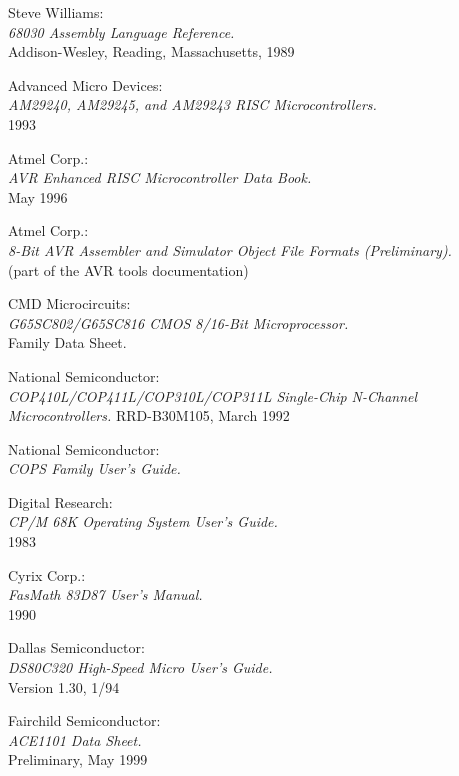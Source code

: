  Steve Williams: \\
                   {\em 68030 Assembly Language Reference.\/} \\
		   Addison-Wesley, Reading, Massachusetts, 1989

 Advanced Micro Devices: \\
		 {\em AM29240, AM29245, and AM29243 RISC
                  Microcontrollers.\/} \\
		 1993

 Atmel Corp.: \\
                {\em AVR Enhanced RISC Microcontroller Data Book.\/} \\ 
                May 1996

 Atmel Corp.: \\
                 {\em 8-Bit AVR Assembler and Simulator Object File
                  Formats (Preliminary).\/} \\
                 (part of the AVR tools documentation)

 CMD Microcircuits: \\
                {\em G65SC802/G65SC816 CMOS 8/16-Bit Microprocessor.\/} \\
		Family Data Sheet.

 National Semiconductor: \\
               {\em COP410L/COP411L/COP310L/COP311L
               Single-Chip N-Channel Microcontrollers.\/}
               RRD-B30M105, March 1992

 National Semiconductor: \\
               {\em COPS Family User's Guide.\/}                               

 Digital Research: \\
                 {\em CP/M 68K Operating System User's Guide.\/} \\
        	 1983

 Cyrix Corp.: \\
                {\em FasMath 83D87 User's Manual.\/} \\
		1990

 Dallas Semiconductor: \\
		    {\em DS80C320 High-Speed Micro User's Guide.\/} \\
                    Version 1.30, 1/94

 Fairchild Semiconductor: \\
                   {\em ACE1101 Data Sheet.\/} \\
                   Preliminary, May 1999

